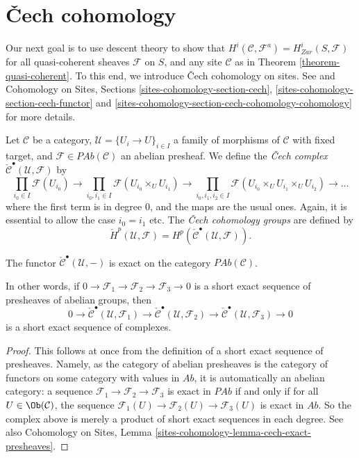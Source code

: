 \section{{\v C}ech cohomology}
\label{section-cech-cohomology}

\noindent
Our next goal is to use descent theory to show that
$H^i(\mathcal{C}, \mathcal{F}^a) = H_{Zar}^i(S, \mathcal{F})$
for all quasi-coherent sheaves $\mathcal{F}$ on $S$, and
any site $\mathcal{C}$ as in Theorem \ref{theorem-quasi-coherent}.
To this end, we introduce {\v C}ech cohomology on sites.
See \cite{ArtinTopologies} and
Cohomology on Sites, Sections \ref{sites-cohomology-section-cech},
\ref{sites-cohomology-section-cech-functor}
and \ref{sites-cohomology-section-cech-cohomology-cohomology}
for more details.

\begin{definition}
\label{definition-cech-complex}
Let $\mathcal{C}$ be a category,
$\mathcal{U} = \{U_i \to U\}_{i \in I}$ a family of morphisms of $\mathcal{C}$
with fixed target, and $\mathcal{F} \in \textit{PAb}(\mathcal{C})$ an abelian
presheaf. We define the {\it {\v C}ech complex}
$\check{\mathcal{C}}^\bullet(\mathcal{U}, \mathcal{F})$ by
$$
\prod_{i_0\in I} \mathcal{F}(U_{i_0}) \to
\prod_{i_0, i_1\in I} \mathcal{F}(U_{i_0} \times_U U_{i_1}) \to
\prod_{i_0, i_1, i_2 \in I}
\mathcal{F}(U_{i_0} \times_U U_{i_1} \times_U U_{i_2}) \to \ldots
$$
where the first term is in degree 0, and the maps are the usual ones. Again, it
is essential to allow the case $i_0 = i_1$ etc. The
{\it {\v C}ech cohomology groups} are defined by
$$
\check{H}^p(\mathcal{U}, \mathcal{F}) =
H^p(\check{\mathcal{C}}^\bullet(\mathcal{U}, \mathcal{F})).
$$
\end{definition}

\begin{lemma}
\label{lemma-cech-presheaves}
The functor $\check{\mathcal{C}}^\bullet(\mathcal{U}, -)$
is exact on the category $\textit{PAb}(\mathcal{C})$.
\end{lemma}

\noindent
In other words, if $0\to \mathcal{F}_1\to \mathcal{F}_2\to \mathcal{F}_3\to 0$
is a short exact sequence of presheaves of abelian groups, then
$$
0 \to \check{\mathcal{C}}^\bullet\left(\mathcal{U}, \mathcal{F}_1\right)
\to\check{\mathcal{C}}^\bullet(\mathcal{U}, \mathcal{F}_2) \to
\check{\mathcal{C}}^\bullet(\mathcal{U}, \mathcal{F}_3)\to 0
$$
is a short exact sequence of complexes.

\begin{proof}
This follows at once from the definition of a short exact sequence of
presheaves. Namely, as the category of abelian presheaves is the category of
functors on some category with values in $\textit{Ab}$, it is automatically an
abelian category: a sequence $\mathcal{F}_1\to \mathcal{F}_2\to \mathcal{F}_3$
is exact in $\textit{PAb}$ if and only if for all
$U \in \Ob(\mathcal{C})$, the sequence
$\mathcal{F}_1(U) \to \mathcal{F}_2(U) \to \mathcal{F}_3(U)$ is exact in
$\textit{Ab}$. So the complex above is merely a product of short exact
sequences in each degree. See also
Cohomology on Sites, Lemma \ref{sites-cohomology-lemma-cech-exact-presheaves}.
\end{proof}

